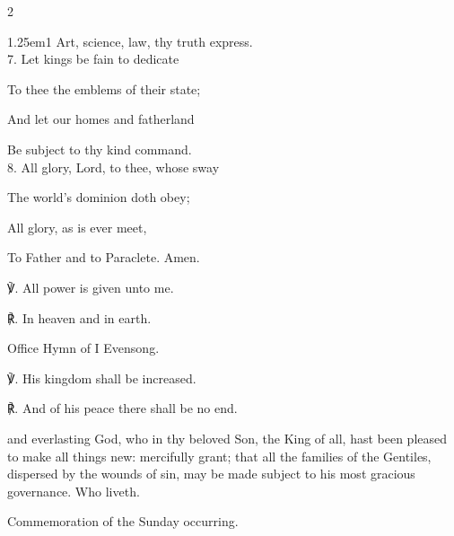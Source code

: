 \begin{paracol}{2}
\begin{hangparas}{1.25em}{1}
Art, science, law, thy truth express.\\

7. Let kings be fain to dedicate

To thee the emblems of their state;

And let our homes and fatherland

Be subject to thy kind command.\\

8. All glory, Lord, to thee, whose sway

The world's dominion doth obey;

All glory, as is ever meet,

To Father and to Paraclete. Amen.\\
\end{hangparas}

℣. All power is given unto me.

℟. In heaven and in earth.


\secondEvensong
{}

\begin{rubric}
	Office Hymn of I Evensong.
\end{rubric}

℣. His kingdom shall be increased.

℟. And of his peace there shall be no end.


\collect
{} and everlasting God, who in thy beloved Son, the King of all, hast been pleased to make all things new: mercifully grant; that all the families of the Gentiles, dispersed by the wounds of sin, may be made subject to his most gracious governance. Who liveth.
\begin{rubric}
    Commemoration of the Sunday occurring.
\end{rubric}

\switchcolumn

\vspace{-0.5\baselineskip}


\end{paracol}
